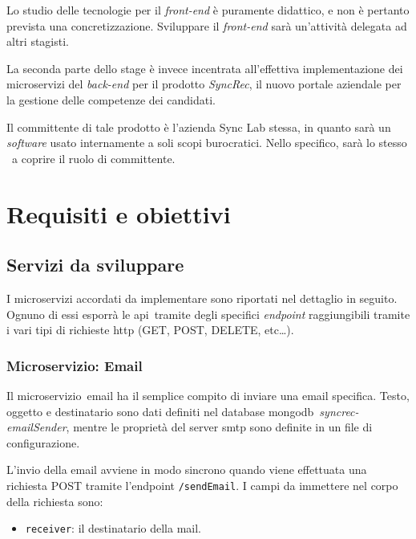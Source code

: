 Lo studio delle tecnologie per il \textit{front-end} è puramente didattico, e non è pertanto prevista una concretizzazione.
Sviluppare il \textit{front-end} sarà un'attività delegata ad altri stagisti.

La seconda parte dello stage è invece incentrata all'effettiva implementazione dei microservizi del \textit{back-end} per il prodotto \textit{SyncRec}, il nuovo portale aziendale per la gestione delle competenze dei candidati.

Il committente di tale prodotto è l'azienda Sync Lab stessa, in quanto sarà un \textit{software} usato internamente a soli scopi burocratici.
Nello specifico, sarà lo stesso \fabio\ a coprire il ruolo di committente.

\section{Requisiti e obiettivi}

\subsection{Servizi  da sviluppare}

I microservizi accordati da implementare sono riportati nel dettaglio in seguito. Ognuno di essi esporrà le \gls{api}\gloss\ tramite degli specifici \textit{endpoint}
raggiungibili tramite i vari tipi di richieste \acrshort{http} (GET, POST, DELETE, etc\dots).


\subsubsection{Microservizio: Email}

Il \gls{microservizio}\gloss\ email ha il semplice compito di inviare una email specifica.
Testo, oggetto e destinatario sono dati definiti nel database \gls{mongodb}\gloss\
\textit{syncrec-emailSender}, mentre le proprietà del server \acrshort{smtp} sono definite in un file di configurazione.

L'invio della email avviene in modo sincrono quando viene effettuata una richiesta POST tramite l'endpoint \texttt{/sendEmail}.
I campi da immettere nel corpo della richiesta sono:
\begin{itemize}
	\item \texttt{receiver}: il destinatario della mail.
\end{itemize}


